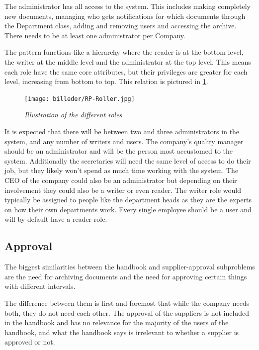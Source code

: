 The administrator has all access to the system.
This includes making completely new documents, managing who gets notifications for which documents through the Department class, adding and removing users and accessing the archive.
There needs to be at least one administrator per Company.

The pattern functions like a hierarchy where the reader is at the bottom level, the writer at the middle level and the administrator at the top level. This means each role have the same core attributes, but their privileges are greater for each level, increasing from bottom to top.
This relation is pictured in \cref{fig:RoleIllustration}.
\begin{figure}[H]
	\centering
	\texttt{[image: billeder/RP-Roller.jpg]}
	\caption{\textit{Illustration of the different roles
	}\label{fig:RoleIllustration}}
\end{figure}

It is expected that there will be between two and three administrators in the system, and any number of writers and users.
The company's quality manager should be an administrator and will be the person most accustomed to the system.
Additionally the secretaries will need the same level of access to do their job, but they likely won't spend as much time working with the system.
The CEO of the company could also be an administrator but depending on their involvement they could also be a writer or even reader.
The writer role would typically be assigned to people like the department heads as they are the experts on how their own departments work.
Every single employee should be a user and will by default have a reader role.

\subsection{Approval}
The biggest similarities between the handbook and supplier-approval subproblems are the need for archiving documents and the need for approving certain things with different intervals.

The difference between them is first and foremost that while the company needs both, they do not need each other.
The approval of the suppliers is not included in the handbook and has no relevance for the majority of the users of the handbook, and what the handbook says is irrelevant to whether a supplier is approved or not.

